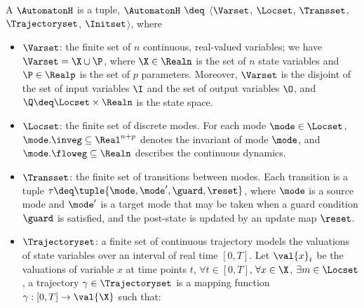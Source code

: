 \begin{definition}
A $\AutomatonH$ is a tuple, $\AutomatonH$ $\deq$ $\langle$$\Varset$, $\Locset$,  $\Transset$, $\Trajectoryset$, $\Initset$$\rangle$, where
%
\begin{itemize}[leftmargin= 2em]
%
%
%
\item $\Varset$: the finite set of $n$ continuous, real-valued variables; we have $\Varset = \X \cup \P$, where $\X \in \Realn$ is the set of $n$ state variables and $\P\in\Realp$ is the set of $p$ parameters. Moreover, $\Varset$ is the disjoint of the set of input variables $\I$ and the set of output variables $\O$, and $\Q \deq \Locset \times \Realn$ is the state space.
%
\item $\Locset$: the finite set of discrete modes.  For each mode $\mode \in \Locset$, $\mode.\inveg \subseteq \Real^{n+p}$ denotes the invariant of mode $\mode$, and $\mode.\floweg \subseteq \Realn$ describes the continuous dynamics.
%
%
%
%
%
%
\item $\Transset$: the finite set of transitions between modes.
%
Each transition is a tuple $\tau \deq \tuple{\mode, \mode', \guard, \reset}$, where $\mode$ is a source mode and $\mode'$ is a target mode that may be taken when a guard condition $\guard$ is satisfied, and the post-state is updated by an update map $\reset$.
%
\item $\Trajectoryset$: a finite set of continuous trajectory models the valuations of state variables over an interval of real time $[0, T]$. Let $\val{x}_t$ be the valuations of variable $x$ at time points $t$, $\forall t \in [0, T]$, $\forall x \in \X$, $\exists m \in \Locset$, a trajectory $\gamma \in \Trajectoryset$ is a mapping function $\gamma: [0, T] \rightarrow \val{\X}$ such that:

\end{itemize}
\end{definition}
